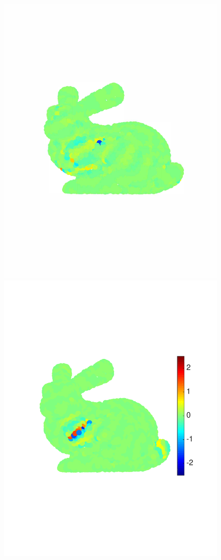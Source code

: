 \documentclass{article}
\begin{document}
\begin{figure}[bth]
\begin{minipage}[m]{0.16\linewidth}
\end{minipage}
\begin{minipage}[m]{0.16\linewidth}
\centerline{\includegraphics[width=.8\linewidth]{fig_bunny_rec_wav3}}
\end{minipage}
\begin{minipage}[m]{0.16\linewidth}
\centerline{\includegraphics[width=.85\linewidth]{fig_bunny_rec_wav4}}

\end{minipage}
\end{figure}
\end{document}
